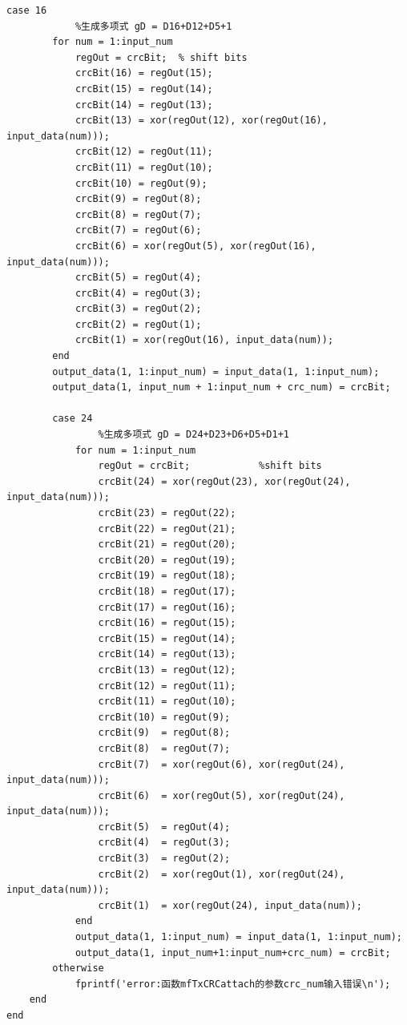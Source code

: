 \documentclass[UTF8]{ctexart}
\begin{document}
\begin{lstlisting}[title=ASK\_AddCRC.m, frame=shadowbox]
        case 16
            %生成多项式 gD = D16+D12+D5+1
        for num = 1:input_num
            regOut = crcBit;  % shift bits
            crcBit(16) = regOut(15);
            crcBit(15) = regOut(14);
            crcBit(14) = regOut(13);
            crcBit(13) = xor(regOut(12), xor(regOut(16), input_data(num)));
            crcBit(12) = regOut(11);
            crcBit(11) = regOut(10);
            crcBit(10) = regOut(9);
            crcBit(9) = regOut(8);
            crcBit(8) = regOut(7);
            crcBit(7) = regOut(6);
            crcBit(6) = xor(regOut(5), xor(regOut(16), input_data(num)));
            crcBit(5) = regOut(4);
            crcBit(4) = regOut(3);
            crcBit(3) = regOut(2);
            crcBit(2) = regOut(1);
            crcBit(1) = xor(regOut(16), input_data(num));
        end
        output_data(1, 1:input_num) = input_data(1, 1:input_num);
        output_data(1, input_num + 1:input_num + crc_num) = crcBit;
    
        case 24
                %生成多项式 gD = D24+D23+D6+D5+D1+1
            for num = 1:input_num
                regOut = crcBit;            %shift bits
                crcBit(24) = xor(regOut(23), xor(regOut(24), input_data(num)));
                crcBit(23) = regOut(22);
                crcBit(22) = regOut(21);
                crcBit(21) = regOut(20);
                crcBit(20) = regOut(19);
                crcBit(19) = regOut(18);
                crcBit(18) = regOut(17);
                crcBit(17) = regOut(16);
                crcBit(16) = regOut(15);	
                crcBit(15) = regOut(14);
                crcBit(14) = regOut(13);
                crcBit(13) = regOut(12);
                crcBit(12) = regOut(11);
                crcBit(11) = regOut(10);
                crcBit(10) = regOut(9);
                crcBit(9)  = regOut(8);
                crcBit(8)  = regOut(7);
                crcBit(7)  = xor(regOut(6), xor(regOut(24), input_data(num)));
                crcBit(6)  = xor(regOut(5), xor(regOut(24), input_data(num)));
                crcBit(5)  = regOut(4);
                crcBit(4)  = regOut(3);
                crcBit(3)  = regOut(2);
                crcBit(2)  = xor(regOut(1), xor(regOut(24), input_data(num)));
                crcBit(1)  = xor(regOut(24), input_data(num)); 
            end 
            output_data(1, 1:input_num) = input_data(1, 1:input_num);
            output_data(1, input_num+1:input_num+crc_num) = crcBit;
        otherwise
            fprintf('error:函数mfTxCRCattach的参数crc_num输入错误\n');
    end    
end
\end{lstlisting}
\end{document}
